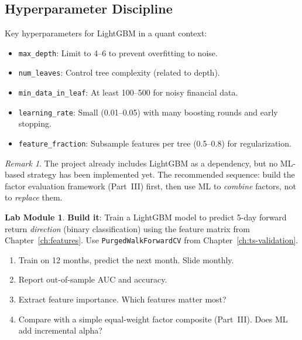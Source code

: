\documentclass[a4paper, 11pt]{report}
\theoremstyle{definition}
\newtheorem{labmod}{Lab Module}[chapter]
\theoremstyle{remark}
\newtheorem{remark}{Remark}[chapter]
\begin{document}
\subsection{Hyperparameter Discipline}

Key hyperparameters for LightGBM in a quant context:

\begin{itemize}
    \item \texttt{max\_depth}: Limit to 4--6 to prevent overfitting to noise.
    \item \texttt{num\_leaves}: Control tree complexity (related to depth).
    \item \texttt{min\_data\_in\_leaf}: At least 100--500 for noisy financial data.
    \item \texttt{learning\_rate}: Small (0.01--0.05) with many boosting rounds
          and early stopping.
    \item \texttt{feature\_fraction}: Subsample features per tree (0.5--0.8)
          for regularization.
\end{itemize}

\begin{remark}
    The project already includes LightGBM as a dependency, but no ML-based
    strategy has been implemented yet.  The recommended sequence: build the
    factor evaluation framework (Part~III) first, then use ML to \emph{combine}
    factors, not to \emph{replace} them.
\end{remark}

\begin{labmod}
    \textbf{Build it}: Train a LightGBM model to predict 5-day forward return
    \emph{direction} (binary classification) using the feature matrix from
    Chapter~\ref{ch:features}.  Use \texttt{PurgedWalkForwardCV} from
    Chapter~\ref{ch:ts-validation}.

    \begin{enumerate}
        \item Train on 12 months, predict the next month.  Slide monthly.
        \item Report out-of-sample AUC and accuracy.
        \item Extract feature importance.  Which features matter most?
        \item Compare with a simple equal-weight factor composite (Part~III).
              Does ML add incremental alpha?
    \end{enumerate}
\end{labmod}
\end{document}
